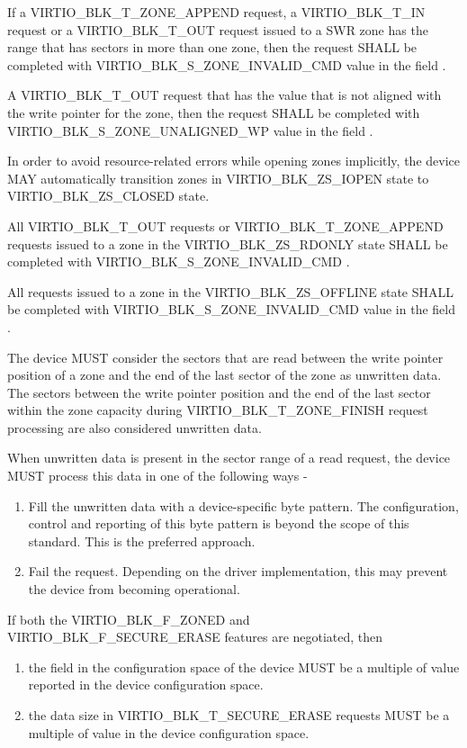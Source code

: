 If a VIRTIO_BLK_T_ZONE_APPEND request, a VIRTIO_BLK_T_IN request or a
VIRTIO_BLK_T_OUT request issued to a SWR zone has the range that has sectors in
more than one zone, then the request SHALL be completed with
VIRTIO_BLK_S_ZONE_INVALID_CMD value in the field .

A VIRTIO_BLK_T_OUT request that has the  value that is not aligned
with the write pointer for the zone, then the request SHALL be completed with
VIRTIO_BLK_S_ZONE_UNALIGNED_WP value in the field .

In order to avoid resource-related errors while opening zones implicitly, the
device MAY automatically transition zones in VIRTIO_BLK_ZS_IOPEN state to
VIRTIO_BLK_ZS_CLOSED state.

All VIRTIO_BLK_T_OUT requests or VIRTIO_BLK_T_ZONE_APPEND requests issued
to a zone in the VIRTIO_BLK_ZS_RDONLY state SHALL be completed with
VIRTIO_BLK_S_ZONE_INVALID_CMD .

All requests issued to a zone in the VIRTIO_BLK_ZS_OFFLINE state SHALL be
completed with VIRTIO_BLK_S_ZONE_INVALID_CMD value in the field .

The device MUST consider the sectors that are read between the write pointer
position of a zone and the end of the last sector of the zone as unwritten data.
The sectors between the write pointer position and the end of the last sector
within the zone capacity during VIRTIO_BLK_T_ZONE_FINISH request processing are
also considered unwritten data.

When unwritten data is present in the sector range of a read request, the device
MUST process this data in one of the following ways -

\begin{enumerate}
\item Fill the unwritten data with a device-specific byte pattern. The
configuration, control and reporting of this byte pattern is beyond the scope
of this standard. This is the preferred approach.

\item Fail the request. Depending on the driver implementation, this may prevent
the device from becoming operational.
\end{enumerate}

If both the VIRTIO_BLK_F_ZONED and VIRTIO_BLK_F_SECURE_ERASE features are
negotiated, then

\begin{enumerate}
\item the field  in the configuration space
of the device MUST be a multiple of  value reported in the
device configuration space.

\item the data size in VIRTIO_BLK_T_SECURE_ERASE requests MUST be a multiple of
 value in the device configuration space.
\end{enumerate}


